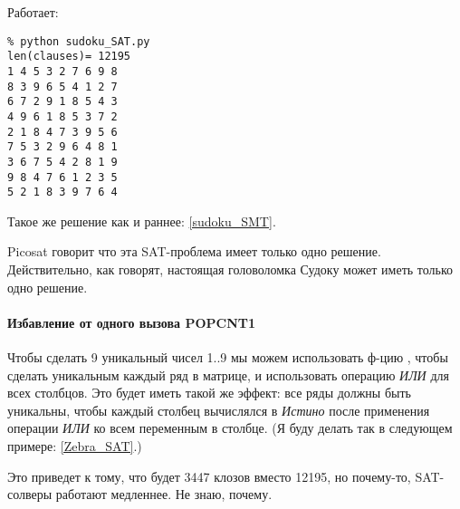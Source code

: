Работает:

\begin{lstlisting}
% python sudoku_SAT.py
len(clauses)= 12195
1 4 5 3 2 7 6 9 8
8 3 9 6 5 4 1 2 7
6 7 2 9 1 8 5 4 3
4 9 6 1 8 5 3 7 2
2 1 8 4 7 3 9 5 6
7 5 3 2 9 6 4 8 1
3 6 7 5 4 2 8 1 9
9 8 4 7 6 1 2 3 5
5 2 1 8 3 9 7 6 4
\end{lstlisting}

Такое же решение как и раннее: \ref{sudoku_SMT}.

Picosat говорит что эта SAT-проблема имеет только одно решение.
Действительно, как говорят, настоящая головоломка Судоку может иметь только одно решение.

\paragraph{Избавление от одного вызова POPCNT1}
\label{OR_in_POPCNT1}

Чтобы сделать 9 уникальный чисел 1..9 мы можем использовать ф-цию , чтобы сделать уникальным каждый ряд
в матрице, и использовать операцию \textit{ИЛИ} для всех столбцов.
Это будет иметь такой же эффект: все ряды должны быть уникальны, чтобы каждый столбец вычислялся в \textit{Истино}
после применения операции \textit{ИЛИ} ко всем переменным в столбце.
(Я буду делать так в следующем примере: \ref{Zebra_SAT}.)

Это приведет к тому, что будет 3447 клозов вместо 12195, но почему-то, SAT-солверы работают медленнее. Не знаю, почему.

